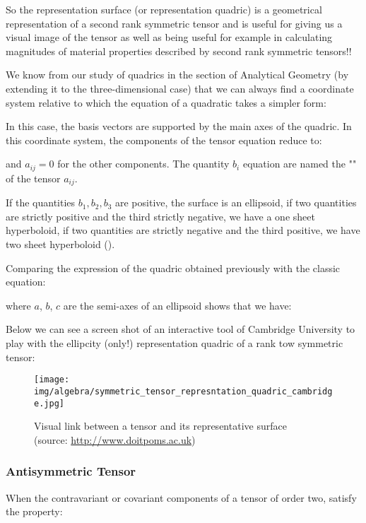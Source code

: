 	So the representation surface (or representation quadric) is a geometrical representation of a second rank symmetric tensor and is useful for giving us a visual image of the tensor as well as being useful for example in calculating magnitudes of material properties described by second rank symmetric tensors!!
	
	We know from our study of quadrics in the section of Analytical Geometry (by extending it to the three-dimensional case) that we can always find a coordinate system relative to which the equation of a quadratic takes a simpler form:
	
	In this case, the basis vectors are supported by the main axes of the quadric. In this coordinate system, the components of the tensor equation reduce to:
	
	and $a_{ij}=0$ for the other components. The quantity $b_i$ equation are named the "" of the tensor $a_{ij}$.

	If the quantities $b_1,b_2,b_3$ are positive, the surface is an ellipsoid, if two quantities are strictly positive and the third strictly negative, we have a one sheet hyperboloid, if two quantities are strictly negative and the third positive, we have two sheet hyperboloid ().
	
	Comparing the expression of the quadric obtained previously with the classic equation:
	
	where $a$, $b$, $c$ are the semi-axes of an ellipsoid shows that we have:
	
	Below we can see a screen shot of an interactive tool of Cambridge University to play with the ellipcity (only!) representation quadric of a rank tow symmetric tensor:
	\begin{figure}[H]
		\centering
		\texttt{[image: img/algebra/symmetric\_tensor\_represntation\_quadric\_cambridge.jpg]}
		\caption[]{Visual link between a tensor and its representative surface \\(source: \href{http://www.doitpoms.ac.uk/tlplib/tensors/representation.php}{http://www.doitpoms.ac.uk})}
	\end{figure}
	
	\subsubsection{Antisymmetric Tensor}
	When the contravariant or covariant components of a tensor of order two, satisfy the property:
	
